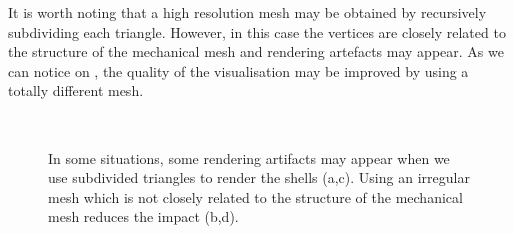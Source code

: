 It is worth noting that a high resolution mesh may be obtained by recursively subdividing each triangle. However, in this case the vertices are closely related to the structure of the mechanical mesh and rendering artefacts may appear. As we can notice on , the quality of the visualisation may be improved by using a totally different mesh.
%
\begin{figure}[ht]
\centering 
{}
\hspace{1cm}
 \\
\hspace{1cm}
\caption[Visual artifacts using triangle subdivisions]{In some situations, some rendering artifacts may appear when we use subdivided triangles to render the shells (a,c). Using an irregular mesh which is not closely related to the structure of the mechanical mesh reduces the impact (b,d).}
\label{chap8:fig-rendering}
\end{figure}


